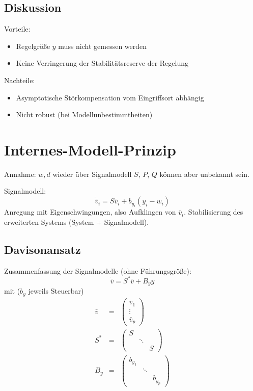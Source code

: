 \subsection{Diskussion}
Vorteile:
\begin{itemize}
    \item Regelgröße $y$ muss nicht gemessen werden
    \item Keine Verringerung der Stabilitätsreserve der Regelung
\end{itemize}

Nachteile:
\begin{itemize}
    \item Asymptotische Störkompensation vom Eingriffsort abhängig
    \item Nicht robust (bei Modellunbestimmtheiten)
\end{itemize}
 
\section{Internes-Modell-Prinzip}
Annahme: $w, d$ wieder über Signalmodell $S$, $P$, $Q$ können aber unbekannt sein.

Signalmodell:
\begin{equation}
    \dot{\bar{v}}_i = S \bar{v}_i + b_{y_i} (y_i - w_i)
\end{equation}
Anregung mit Eigenschwingungen, also Aufklingen von $\bar{v}_i$. Stabilisierung
des erweiterten Systems (System + Signalmodell).

\subsection{Davisonansatz}
Zusammenfassung der Signalmodelle (ohne Führungsgröße):
\begin{equation}
    \dot{\bar{v}} = S^* \bar{v} + B_y y
\end{equation}
mit ($b_y$ jeweils Steuerbar)
\begin{eqnarray}
    \bar{v} &=& \begin{pmatrix}
            \bar{v}_1 \\ \vdots \\ \bar{v}_p
        \end{pmatrix} \\
    S^* &=& \begin{pmatrix}
            S \\
             & \ddots \\
             & & S
        \end{pmatrix} \\
    B_y &=& \begin{pmatrix}
            b_{y_1} \\
             & \ddots \\
             & & b_{y_p}
        \end{pmatrix}
\end{eqnarray}

